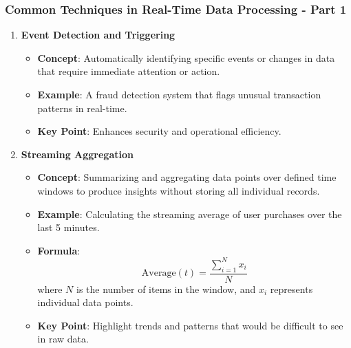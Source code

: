 \documentclass[aspectratio=169]{beamer}
\begin{document}
\begin{frame}[fragile]
    \frametitle{Common Techniques in Real-Time Data Processing - Part 1}
    \begin{enumerate}
        \item \textbf{Event Detection and Triggering}
        \begin{itemize}
            \item \textbf{Concept}: Automatically identifying specific events or changes in data that require immediate attention or action.
            \item \textbf{Example}: A fraud detection system that flags unusual transaction patterns in real-time.
            \item \textbf{Key Point}: Enhances security and operational efficiency.
        \end{itemize}

        \item \textbf{Streaming Aggregation}
        \begin{itemize}
            \item \textbf{Concept}: Summarizing and aggregating data points over defined time windows to produce insights without storing all individual records.
            \item \textbf{Example}: Calculating the streaming average of user purchases over the last 5 minutes.
            \item \textbf{Formula}:
            \begin{equation}
                \text{Average}(t) = \frac{\sum_{i=1}^{N} x_i}{N}
            \end{equation}
            where \(N\) is the number of items in the window, and \(x_i\) represents individual data points.
            \item \textbf{Key Point}: Highlight trends and patterns that would be difficult to see in raw data.
        \end{itemize}
    \end{enumerate}
\end{frame}
\end{document}
